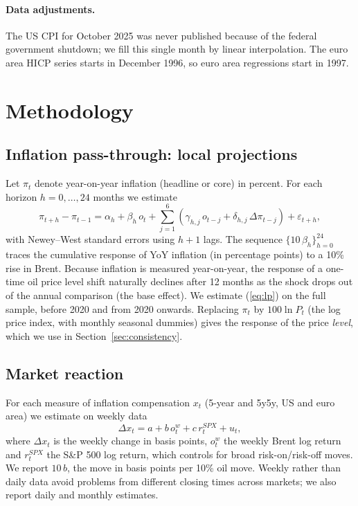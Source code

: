 \documentclass[11pt,a4paper]{article}
\begin{document}
\paragraph{Data adjustments.} The US CPI for October 2025 was never published because of the federal government shutdown; we fill this single month by linear interpolation. The euro area HICP series starts in December 1996, so euro area regressions start in 1997.

\section{Methodology}

\subsection{Inflation pass-through: local projections}
Let $\pi_t$ denote year-on-year inflation (headline or core) in percent. For each horizon $h=0,\dots,24$ months we estimate
\begin{equation}
\pi_{t+h}-\pi_{t-1} = \alpha_h + \beta_h\, o_t + \sum_{j=1}^{6}\left(\gamma_{h,j}\, o_{t-j} + \delta_{h,j}\,\Delta\pi_{t-j}\right) + \varepsilon_{t+h},
\label{eq:lp}
\end{equation}
with Newey--West standard errors using $h+1$ lags. The sequence $\{10\,\beta_h\}_{h=0}^{24}$ traces the cumulative response of YoY inflation (in percentage points) to a 10\% rise in Brent. Because inflation is measured year-on-year, the response of a one-time oil price level shift naturally declines after 12 months as the shock drops out of the annual comparison (the base effect). We estimate (\ref{eq:lp}) on the full sample, before 2020 and from 2020 onwards. Replacing $\pi_t$ by $100\ln P_t$ (the log price index, with monthly seasonal dummies) gives the response of the price \emph{level}, which we use in Section~\ref{sec:consistency}.

\subsection{Market reaction}
For each measure of inflation compensation $x_t$ (5-year and 5y5y, US and euro area) we estimate on weekly data
\begin{equation}
\Delta x_t = a + b\, o^{w}_t + c\, r^{SPX}_t + u_t,
\label{eq:mkt}
\end{equation}
where $\Delta x_t$ is the weekly change in basis points, $o^w_t$ the weekly Brent log return and $r^{SPX}_t$ the S\&P 500 log return, which controls for broad risk-on/risk-off moves. We report $10\,b$, the move in basis points per 10\% oil move. Weekly rather than daily data avoid problems from different closing times across markets; we also report daily and monthly estimates.
\end{document}

